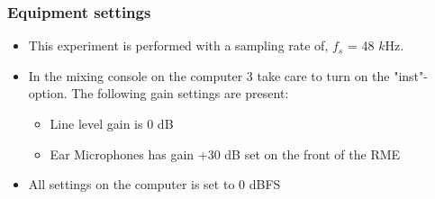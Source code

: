 \subsubsection{Equipment settings}
\begin{itemize}
	\item This experiment is performed with a sampling rate of, $f_{s}$ = 48 $k$Hz. 
	\item In the mixing console on the computer 3 take care to turn on the "inst"-option. The following gain settings are present: 		
	\begin{itemize}
		\item Line level gain is 0 dB
		\item Ear Microphones has gain +30 dB set on the front of the RME
	\end{itemize}
	\item All settings on the computer is set to 0 dBFS
\end{itemize}
	
	
